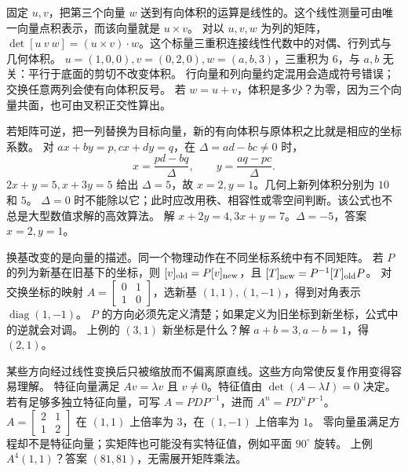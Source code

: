 \idea 固定 $u,v$，把第三个向量 $w$ 送到有向体积的运算是线性的。这个线性测量可由唯一向量点积表示，而该向量就是 $u\times v$。
\mathpart 对以 $u,v,w$ 为列的矩阵，$\det[u\ v\ w]=(u\times v)\cdot w$。这个标量三重积连接线性代数中的对偶、行列式与几何体积。
\examplepart $u=(1,0,0),v=(0,2,0),w=(a,b,3)$，三重积为 $6$，与 $a,b$ 无关：平行于底面的剪切不改变体积。
\pitfall 行向量和列向量约定混用会造成符号错误；交换任意两列会使有向体积反号。
\exercise 若 $w=u+v$，体积是多少？为零，因为三个向量共面，也可由叉积正交性算出。
\nextlesson

\idea 若矩阵可逆，把一列替换为目标向量，新的有向体积与原体积之比就是相应的坐标系数。
\mathpart 对 $ax+by=p,cx+dy=q$，在 $\Delta=ad-bc\ne0$ 时，
\[x=\frac{pd-bq}{\Delta},\qquad y=\frac{aq-pc}{\Delta}.\]
\examplepart $2x+y=5,x+3y=5$ 给出 $\Delta=5$，故 $x=2,y=1$。几何上新列体积分别为 $10$ 和 $5$。
\pitfall $\Delta=0$ 时不能除以它；此时应改用秩、相容性或零空间判断。该公式也不总是大型数值求解的高效算法。
\exercise 解 $x+2y=4,3x+y=7$。$\Delta=-5$，答案 $x=2,y=1$。
\nextlesson

\idea 换基改变的是向量的描述。同一个物理动作在不同坐标系统中有不同矩阵。
\mathpart 若 $P$ 的列为新基在旧基下的坐标，则 $[v]_{\rm old}=P[v]_{\rm new}$，且 $[T]_{\rm new}=P^{-1}[T]_{\rm old}P$。
\examplepart 对交换坐标的映射 $A=\left[\begin{smallmatrix}0&1\\1&0\end{smallmatrix}\right]$，选新基 $(1,1),(1,-1)$，得到对角表示 $\operatorname{diag}(1,-1)$。
\pitfall $P$ 的方向必须先定义清楚；如果定义为旧坐标到新坐标，公式中的逆就会对调。
\exercise 上例的 $(3,1)$ 新坐标是什么？解 $a+b=3,a-b=1$，得 $(2,1)$。
\nextlesson

\idea 某些方向经过线性变换后只被缩放而不偏离原直线。这些方向常使反复作用变得容易理解。
\mathpart 特征向量满足 $Av=\lambda v$ 且 $v\ne0$。特征值由 $\det(A-\lambda I)=0$ 决定。若有足够多独立特征向量，可写 $A=PDP^{-1}$，进而 $A^n=PD^nP^{-1}$。
\examplepart $A=\left[\begin{smallmatrix}2&1\\1&2\end{smallmatrix}\right]$ 在 $(1,1)$ 上倍率为 $3$，在 $(1,-1)$ 上倍率为 $1$。
\pitfall 零向量虽满足方程却不是特征向量；实矩阵也可能没有实特征值，例如平面 $90^\circ$ 旋转。
\exercise 上例 $A^4(1,1)$？答案 $(81,81)$，无需展开矩阵乘法。
\nextlesson

